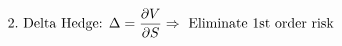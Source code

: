 \documentclass[preview]{standalone}
\begin{document}
\begin{align*}
\special{dvisvgm:raw <g id='unique000'>}2. \text{ Delta Hedge: } \Delta = \frac{\partial V}{\partial S} \Rightarrow \text{ Eliminate 1st order risk}\special{dvisvgm:raw </g>}
\end{align*}
\end{document}
